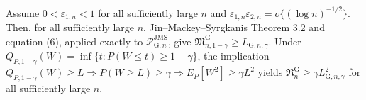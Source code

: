 Assume \(0<\varepsilon_{1,n}<1\) for all sufficiently large \(n\) and \(\varepsilon_{1,n}\varepsilon_{2,n}=o\{(\log n)^{-1/2}\}\). Then, for all sufficiently large \(n\), Jin--Mackey--Syrgkanis Theorem 3.2 and equation (6), applied exactly to \(\mathcal P_{\mathrm G,n}^{\mathrm{JMS}}\), give \(\mathfrak M_{n,1-\gamma}^{\mathrm G}\ge L_{\mathrm G,n,\gamma}\). Under \(Q_{P,1-\gamma}(W)=\inf\{t:P(W\le t)\ge1-\gamma\}\), the implication \(Q_{P,1-\gamma}(W)\ge L\Rightarrow P(W\ge L)\ge\gamma\Rightarrow E_P[W^2]\ge\gamma L^2\) yields \(\mathfrak R_n^{\mathrm G}\ge\gamma L_{\mathrm G,n,\gamma}^2\) for all sufficiently large \(n\).